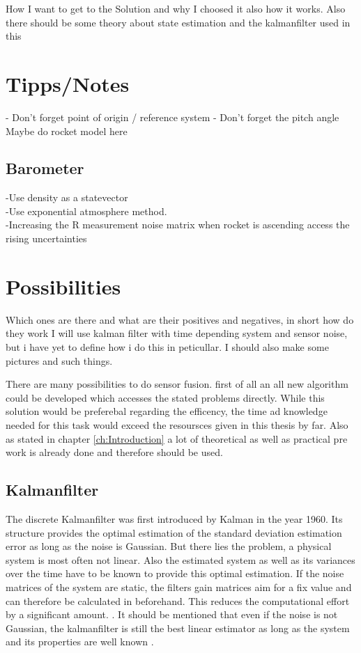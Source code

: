 
  How I want to get to the Solution and why I choosed it also how it works.
  Also there should be some theory about state estimation and the kalmanfilter used
  in this
  
  \section{Tipps/Notes}
  - Don't forget point of origin / reference system
  - Don't forget the pitch angle
  Maybe do rocket model here
 
  
  \subsection{Barometer}
  -Use density as a statevector \\
  -Use exponential atmosphere method. \\
  -Increasing the R measurement noise matrix when rocket is ascending access the rising uncertainties
  
  
  \section{Possibilities}
  Which ones are there and what are their positives and negatives, in short how do they work
  I will use kalman filter with time depending system and sensor noise, but i have yet to define how i do this in peticullar.
  I should also make some pictures and such things.
  
  There are many possibilities to do sensor fusion. first of all an all new algorithm could be developed which accesses the 
  stated problems directly. While this solution would be preferebal regarding the efficency, the 
  time ad knowledge needed for this task would exceed the resoursces given in this thesis by far.
  Also as stated in chapter \ref{ch:Introduction} a lot of theoretical as well as practical pre work is
  already done and therefore should be used. 
  
  \subsection{Kalmanfilter}
  The discrete Kalmanfilter was first introduced by Kalman in the year 1960.
  Its structure provides the optimal estimation of the standard deviation estimation error as long as the noise is Gaussian.
  But there lies the problem, a physical system is most often not linear.
  Also the estimated system as well as its variances over the time have to be known to provide this optimal estimation.
  If the noise matrices of the system are static, the filters gain matrices aim for a fix value and can therefore be calculated in beforehand.
  This reduces the computational effort by a significant amount. \cite{DavidWSchultz2004}.
  It should be mentioned that even if the noise is not Gaussian, the kalmanfilter is still the best
  linear estimator as long as the system and its properties are well known \cite{SimonDan2006Ose:}.
  
